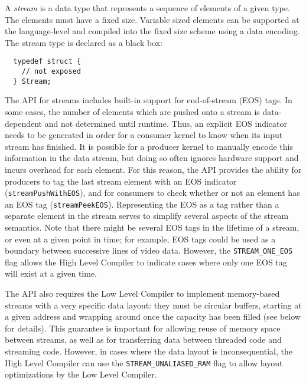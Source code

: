A {\it stream} is a data type that represents a sequence of elements
of a given type.  The elements must have a fixed size. Variable sized
elements can be supported at the language-level and compiled into the
fixed size scheme using a data encoding. The stream type is declared
as a black box:
{\small
\begin{verbatim}
  typedef struct {
    // not exposed
  } Stream;
\end{verbatim}}
The API for streams includes built-in support for end-of-stream (EOS)
tags.  In some cases, the number of elements which are pushed onto a
stream is data-dependent and not determined until runtime.  Thus, an
explicit EOS indicator needs to be generated in order for a consumer
kernel to know when its input stream has finished.  It is possible for
a producer kernel to manually encode this information in the data
stream, but doing so often ignores hardware support and incurs
overhead for each element.  For this reason, the API provides the
ability for producers to tag the last stream element with an EOS
indicator ({\tt streamPushWithEOS}), and for consumers to check
whether or not an element has an EOS tag ({\tt streamPeekEOS}).
Representing the EOS as a tag rather than a separate element in the
stream serves to simplify several aspects of the stream semantics.
Note that there might be several EOS tags in the lifetime of a stream,
or even at a given point in time; for example, EOS tags could be used
as a boundary between successive lines of video data.  However, the
{\tt STREAM\_ONE\_EOS} flag allows the High Level Compiler to indicate
cases where only one EOS tag will exist at a given time.

The API also requires the Low Level Compiler to implement memory-based
streams with a very specific data layout: they must be circular
buffers, starting at a given address and wrapping around once the
capacity has been filled (see below for details).  This guarantee is
important for allowing reuse of memory space between streams, as well
as for transferring data between threaded code and streaming code.
However, in cases where the data layout is inconsequential, the High
Level Compiler can use the {\tt STREAM\_UNALIASED\_RAM} flag to allow
layout optimizations by the Low Level Compiler.

